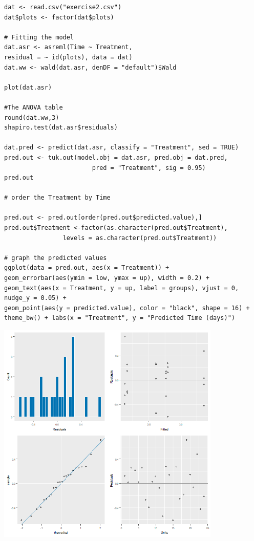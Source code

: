\documentclass[a4paper, 10pt, fleqn, twosided]{memoir}
\begin{document}

\begin{tcolorbox}[title = Exercise 8 code]
\begin{verbatim}
dat <- read.csv("exercise2.csv")
dat$plots <- factor(dat$plots)

# Fitting the model
dat.asr <- asreml(Time ~ Treatment,
residual = ~ id(plots), data = dat)
dat.ww <- wald(dat.asr, denDF = "default")$Wald

plot(dat.asr)

#The ANOVA table
round(dat.ww,3)
shapiro.test(dat.asr$residuals)

dat.pred <- predict(dat.asr, classify = "Treatment", sed = TRUE)
pred.out <- tuk.out(model.obj = dat.asr, pred.obj = dat.pred,
                        pred = "Treatment", sig = 0.95)
pred.out

# order the Treatment by Time

pred.out <- pred.out[order(pred.out$predicted.value),]
pred.out$Treatment <-factor(as.character(pred.out$Treatment),
                levels = as.character(pred.out$Treatment))

# graph the predicted values 
ggplot(data = pred.out, aes(x = Treatment)) +
geom_errorbar(aes(ymin = low, ymax = up), width = 0.2) +
geom_text(aes(x = Treatment, y = up, label = groups), vjust = 0, nudge_y = 0.05) +
geom_point(aes(y = predicted.value), color = "black", shape = 16) +
theme_bw() + labs(x = "Treatment", y = "Predicted Time (days)")
\end{verbatim}
\end{tcolorbox}

\begin{tcolorbox}[title = Exercise 8 output]
\includegraphics[width=0.8\textwidth, frame]{Exercise8Resplot.png}
\end{tcolorbox}
\end{document}
